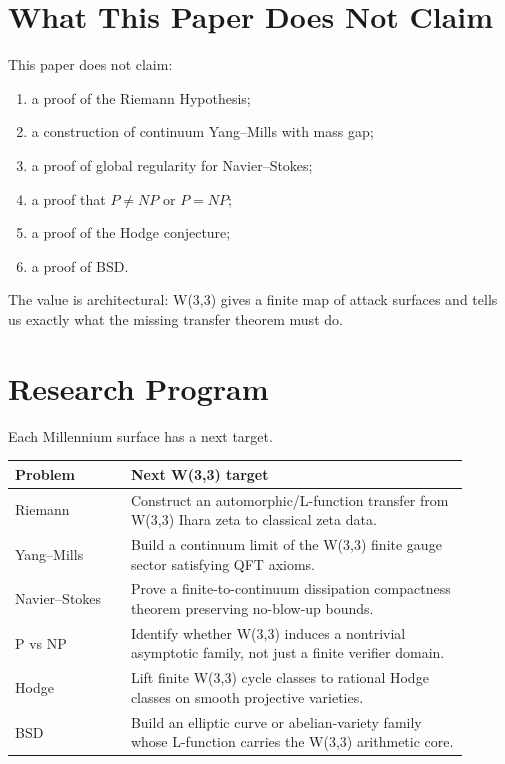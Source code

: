 \documentclass[11pt]{article}
\theoremstyle{definition}
\begin{document}
\section{What This Paper Does Not Claim}

This paper does not claim:
\begin{enumerate}[leftmargin=2em]
  \item a proof of the Riemann Hypothesis;
  \item a construction of continuum Yang--Mills with mass gap;
  \item a proof of global regularity for Navier--Stokes;
  \item a proof that \(P\ne NP\) or \(P=NP\);
  \item a proof of the Hodge conjecture;
  \item a proof of BSD.
\end{enumerate}

The value is architectural: W(3,3) gives a finite map of attack surfaces and tells us exactly what the missing transfer theorem must do.

\section{Research Program}

Each Millennium surface has a next target.

\begin{center}
\begin{tabular}{p{0.23\linewidth}p{0.67\linewidth}}
\toprule
Problem & Next W(3,3) target \\
\midrule
Riemann & Construct an automorphic/L-function transfer from W(3,3) Ihara zeta to classical zeta data. \\
Yang--Mills & Build a continuum limit of the W(3,3) finite gauge sector satisfying QFT axioms. \\
Navier--Stokes & Prove a finite-to-continuum dissipation compactness theorem preserving no-blow-up bounds. \\
P vs NP & Identify whether W(3,3) induces a nontrivial asymptotic family, not just a finite verifier domain. \\
Hodge & Lift finite W(3,3) cycle classes to rational Hodge classes on smooth projective varieties. \\
BSD & Build an elliptic curve or abelian-variety family whose L-function carries the W(3,3) arithmetic core. \\
\bottomrule
\end{tabular}
\end{center}
\end{document}
